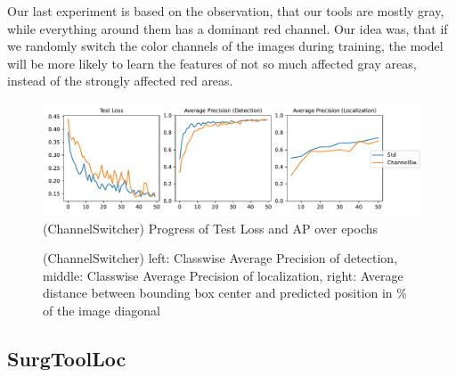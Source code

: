 Our last experiment is based on the observation, that our tools are mostly gray, while everything around them has a dominant red channel. Our idea was, that if we randomly switch the color channels of the images during training, the model will be more likely to learn the features of not so much affected gray areas, instead of the strongly affected red areas.

\begin{figure}[h]
	\centering
	\includegraphics[width=15cm]{4_experiments/images/2_cs_exp/APs.pdf}
	\caption{(ChannelSwitcher) Progress of Test Loss and AP over epochs}
	\label{fig:cs_aps}
\end{figure}

\begin{figure}[h]
	\centering
	\caption{(ChannelSwitcher) left: Classwise Average Precision of detection, middle: Classwise Average Precision of localization, right: Average distance between bounding box center and predicted position in \% of the image diagonal}
	\label{fig:cd_distances}
\end{figure}


\FloatBarrier
\subsection{SurgToolLoc}


